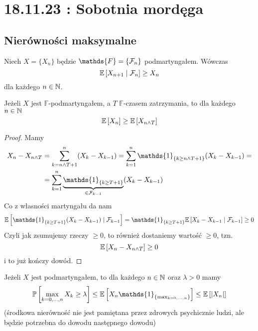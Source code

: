 \section{18.11.23 : Sobotnia mordęga}

\subsection{Nierówności maksymalne}

Niech $X=\{X_n\}$ będzie $\mathds{F}=\{\set{F}_n\}$ podmartyngałem. Wówczas 
$$\expected{X_{n+1}}{\set{F}_n}\geq X_n$$
dla każdego $n\in\operatorname{\mathbb{N}}$.

\begin{theorem}\label{zatrzymanie podmartyngałów}
  Jeżeli $X$ jest $\mathds{F}$-podmartyngałem, a $T$ $\mathds{F}$-czasem zatrzymania, to dla każdego $n\in\operatorname{\mathbb{N}}$ 
  $$\expected{X_n}\geq\expected{X_{n\land T}}$$
\end{theorem}

\begin{proof}
  Mamy 
  \begin{align*}
    X_n-X_{n\land T}&=\sum_{k=n\land T+1}^n(X_k-X_{k-1})=\sum_{k=1}^n\mathds{1}_{\{k\geq n\land T+1\}}(X_k-X_{k-1})=\\ 
                    &=\sum_{k=1}^n\underbrace{\mathds{1}_{\{k\geq T+1\}}}_{\in\set{F}_{k-1}}(X_k-X_{k-1})
  \end{align*}
  Co z własności martyngału da nam
  \begin{align*}
    \expected{\mathds{1}_{\{k\geq T+1\}}(X_k-X_{k-1})}{\set{F}_{k-1}}=\mathds{1}_{\{k\geq T+1\}}\expected{X_k-X_{k-1}}{\set{F}_{k-1}}\geq 0
  \end{align*}
  Czyli jak zsumujemy rzeczy $\geq0$, to również dostaniemy wartość $\geq0$, tzn.
  $$\expected{X_n-X_{n\land T}}\geq0$$
  i to już kończy dowód.
\end{proof}

\begin{theorem}\label{max slabego}
  Jeżeli $X$ jest podmartyngałem, to dla każdego $n\in\operatorname{\mathbb{N}}$ oraz $\lambda>0$ mamy
  $$\prob{\max_{k=0,...,n}X_k\geq\lambda}\leq \expected{X_n\mathds{1}_{\{\max_{k=0,...,n}\}}}\leq \expected{|X_n|}$$
  (środkowa nierówność nie jest pamiętana przez zdrowych psychicznie ludzi, ale będzie potrzebna do dowodu następnego dowodu)
\end{theorem}

